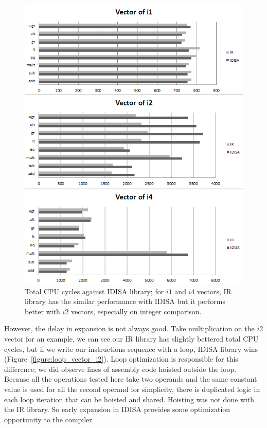 \begin{figure}[htbp!]
\centering
\includegraphics[width=140mm]{draw/cpu_cycles_vector.png}
\caption[Total CPU cycles against IDISA library]{Total CPU cycles against IDISA library; for $i1$ and $i4$ vectors, IR library has the similar performance with IDISA but it performs better with $i2$ vectors, especially on integer comparison.}
\label{figure:cpu_cycles_vector}
\end{figure}

However, the delay in expansion is not always good. Take multiplication on the $i2$ vector for an example, we can see our IR library has slightly bettered total CPU cycles, but if we write our instructions sequence with a loop, IDISA library wins (Figure~\ref{figure:loop_vector_i2}). Loop optimization is responsible for this difference; we did observe lines of assembly code hoisted outside the loop. Because all the operations tested here take two operands and the same constant value is used for all the second operand for simplicity, there is duplicated logic in each loop iteration that can be hoisted and shared. Hoisting was not done with the IR library. So early expansion in IDISA provides some optimization opportunity to the compiler.


